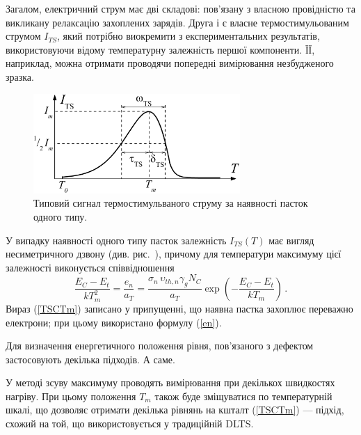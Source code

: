 \documentclass[10pt,a5paper,titlepage,oneside]{book}
\numberwithin{equation}{part}
\begin{document}
Загалом, електричний струм має дві складові:
пов'язану з власною провідністю та викликану релаксацію захоплених зарядів.
Друга і є власне термостимульованим струмом $I_{TS}$, який потрібно виокремити з експериментальних результатів,
використовуючи відому температурну залежність першої компоненти.
ЇЇ, наприклад, можна отримати проводячи попередні вимірювання незбудженого зразка.

\begin{figure}[t]
\center
\vspace{-2mm}
\includegraphics[width=0.7\textwidth]{Fig4_1}
\vspace{-3mm}
\caption{Типовий сигнал термостимульваного струму
за наявності пасток одного типу.}
\vspace{-3mm}
\label{F41}
\end{figure}

У випадку наявності одного типу пасток залежність $I_{TS}(T)$ має вигляд
несиметричного дзвону (див. рис.~),
причому для температури максимуму цієї залежності виконується співвідношення
\begin{equation}
\label{TSCTm}
\frac{E_C-E_t}{kT_m^2}=\frac{e_n}{a_T}=\frac{\sigma_n\,\upsilon_{th,n}\gamma_g N_C}{a_T}\exp\left(-\frac{E_C-E_t}{kT_m}\right)\,.
\end{equation}
Вираз (\ref{TSCTm}) записано у припущенні, що наявна пастка захоплює переважно електрони;
при цьому використано формулу (\ref{en}).

Для визначення енергетичного положення рівня, пов'язаного з дефектом застосовують декілька підходів.
А саме.

У методі зсуву максимуму проводять вимірювання при декількох швидкостях нагріву.
При цьому положення $T_m$ також буде зміщуватися по температурній шкалі, що
дозволяє отримати декілька рівнянь на кшталт (\ref{TSCTm}) ---
підхід, схожий на той, що використовується у традиційній DLTS.
\end{document}
